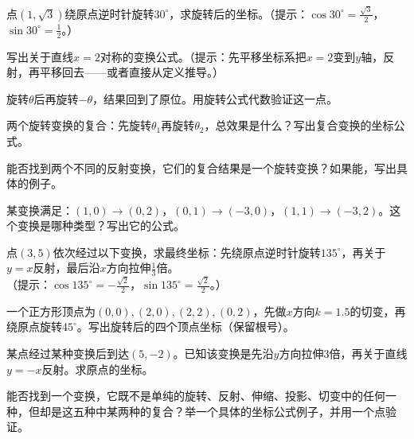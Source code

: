 \begin{exercise}
\item 点$(1,\sqrt3)$绕原点逆时针旋转$30^\circ$，求旋转后的坐标。（提示：$\cos30^\circ=\frac{\sqrt3}{2}$，$\sin30^\circ=\frac12$。）
\item 写出关于直线$x=2$对称的变换公式。（提示：先平移坐标系把$x=2$变到$y$轴，反射，再平移回去——或者直接从定义推导。）
\item 旋转$\theta$后再旋转$-\theta$，结果回到了原位。用旋转公式代数验证这一点。
\item 两个旋转变换的复合：先旋转$\theta_1$再旋转$\theta_2$，总效果是什么？写出复合变换的坐标公式。
\item 能否找到两个不同的反射变换，它们的复合结果是一个旋转变换？如果能，写出具体的例子。
\item 某变换满足：$(1,0)\to(0,2)$，$(0,1)\to(-3,0)$，$(1,1)\to(-3,2)$。这个变换是哪种类型？写出它的公式。
\item 点$(3,5)$依次经过以下变换，求最终坐标：先绕原点逆时针旋转$135^\circ$，再关于$y=x$反射，最后沿$x$方向拉伸$\frac13$倍。\\
（提示：$\cos135^\circ=-\frac{\sqrt2}{2}$，$\sin135^\circ=\frac{\sqrt2}{2}$。）
\item 一个正方形顶点为$(0,0),(2,0),(2,2),(0,2)$，先做$x$方向$k=1.5$的切变，再绕原点旋转$45^\circ$。写出旋转后的四个顶点坐标（保留根号）。
\item 某点经过某种变换后到达$(5,-2)$。已知该变换是先沿$y$方向拉伸$3$倍，再关于直线$y=-x$反射。求原点的坐标。
\item 能否找到一个变换，它既不是单纯的旋转、反射、伸缩、投影、切变中的任何一种，但却是这五种中某两种的复合？举一个具体的坐标公式例子，并用一个点验证。
\end{exercise}

\newpage
